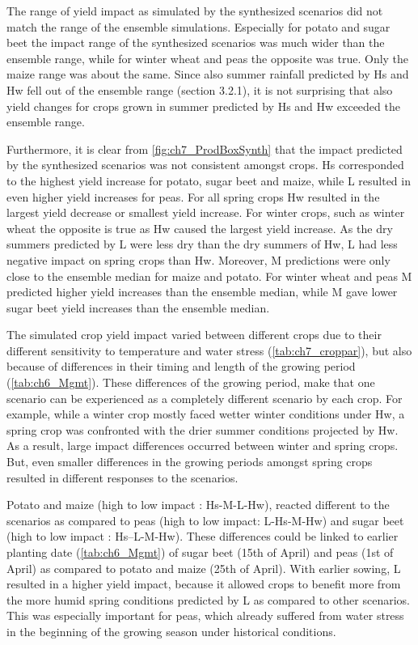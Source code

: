 The range of yield impact as simulated by the synthesized scenarios did not match the range of the ensemble simulations. Especially for potato and sugar beet the impact range of the synthesized scenarios was much wider than the ensemble range, while for winter wheat and peas the opposite was true. Only the maize range was about the same. Since also summer rainfall predicted by Hs and Hw fell out of the ensemble range (section 3.2.1),  it is not surprising that also yield changes for crops grown in summer predicted by Hs and Hw exceeded the ensemble range.   

Furthermore, it is clear from \autoref{fig:ch7_ProdBoxSynth} that the impact predicted by the synthesized scenarios was not consistent amongst crops. Hs corresponded to the highest yield increase for potato, sugar beet and maize, while L resulted in even higher yield increases for peas. For all spring crops Hw resulted in the largest yield decrease or smallest yield increase. For winter crops, such as winter wheat  the opposite is true as Hw caused the largest yield increase. As the dry summers predicted by L were less dry than the dry summers of Hw, L had less negative impact on spring crops than Hw. Moreover, M predictions were only close to the ensemble median for maize and potato. For winter wheat and peas M predicted higher yield increases than the ensemble median, while M gave lower sugar beet yield increases than the ensemble median.

The simulated crop yield impact varied between different crops due to their different sensitivity to temperature and water stress (\autoref{tab:ch7_croppar}), but also because of differences in their timing and length of the growing period (\autoref{tab:ch6_Mgmt}). These differences of the growing period, make that one scenario can be experienced as a completely different scenario by  each crop. For example, while a winter crop mostly faced wetter winter conditions under Hw, a spring crop was confronted with the drier summer conditions projected by Hw. As a result, large impact differences occurred between winter and spring crops. But, even smaller differences in the growing periods amongst spring crops resulted in different responses to the scenarios. 

Potato and maize (high to low impact : Hs-M-L-Hw), reacted different to the scenarios as compared to peas (high to low impact: L-Hs-M-Hw) and sugar beet (high to low impact : Hs–L-M-Hw). These differences could be linked to earlier planting date (\autoref{tab:ch6_Mgmt}) of sugar beet (15th of April) and peas (1st of April) as compared to potato and maize (25th of April). With earlier sowing, L resulted in a higher yield impact, because it allowed crops to benefit more from the more humid spring conditions predicted by L as compared to other scenarios. This was especially important for peas, which already suffered from water stress in the beginning of the growing season under historical conditions. 


